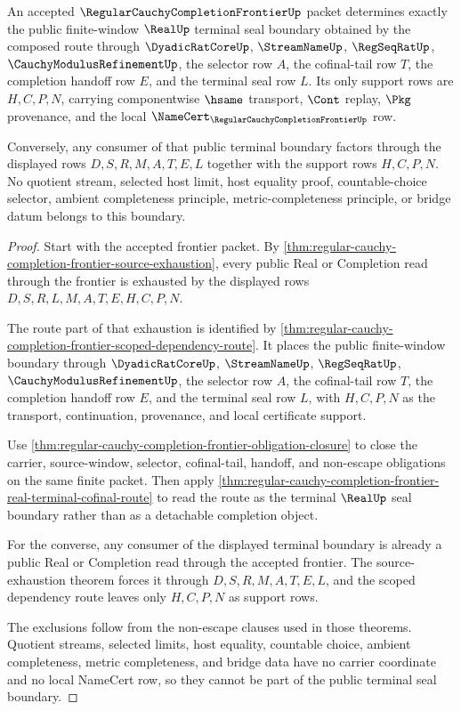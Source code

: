 \begin{theorem}
\label{thm:regular-cauchy-completion-frontier-terminal-seal-correspondence}
An accepted $\RegularCauchyCompletionFrontierUp$ packet determines exactly the public finite-window $\RealUp$ terminal seal boundary obtained by the composed route through $\DyadicRatCoreUp$, $\StreamNameUp$, $\RegSeqRatUp$, $\CauchyModulusRefinementUp$, the selector row $A$, the cofinal-tail row $T$, the completion handoff row $E$, and the terminal seal row $L$. Its only support rows are $H,C,P,N$, carrying componentwise $\hsame$ transport, $\Cont$ replay, $\Pkg$ provenance, and the local $\NameCert_{\RegularCauchyCompletionFrontierUp}$ row.

Conversely, any consumer of that public terminal boundary factors through the displayed rows $D,S,R,M,A,T,E,L$ together with the support rows $H,C,P,N$. No quotient stream, selected host limit, host equality proof, countable-choice selector, ambient completeness principle, metric-completeness principle, or bridge datum belongs to this boundary.
\end{theorem}
\begin{proof}
Start with the accepted frontier packet. By \autoref{thm:regular-cauchy-completion-frontier-source-exhaustion}, every public Real or Completion read through the frontier is exhausted by the displayed rows $D,S,R,L,M,A,T,E,H,C,P,N$.

The route part of that exhaustion is identified by \autoref{thm:regular-cauchy-completion-frontier-scoped-dependency-route}. It places the public finite-window boundary through $\DyadicRatCoreUp$, $\StreamNameUp$, $\RegSeqRatUp$, $\CauchyModulusRefinementUp$, the selector row $A$, the cofinal-tail row $T$, the completion handoff row $E$, and the terminal seal row $L$, with $H,C,P,N$ as the transport, continuation, provenance, and local certificate support.

Use \autoref{thm:regular-cauchy-completion-frontier-obligation-closure} to close the carrier, source-window, selector, cofinal-tail, handoff, and non-escape obligations on the same finite packet. Then apply \autoref{thm:regular-cauchy-completion-frontier-real-terminal-cofinal-route} to read the route as the terminal $\RealUp$ seal boundary rather than as a detachable completion object.

For the converse, any consumer of the displayed terminal boundary is already a public Real or Completion read through the accepted frontier. The source-exhaustion theorem forces it through $D,S,R,M,A,T,E,L$, and the scoped dependency route leaves only $H,C,P,N$ as support rows.

The exclusions follow from the non-escape clauses used in those theorems. Quotient streams, selected limits, host equality, countable choice, ambient completeness, metric completeness, and bridge data have no carrier coordinate and no local NameCert row, so they cannot be part of the public terminal seal boundary.
\end{proof}

